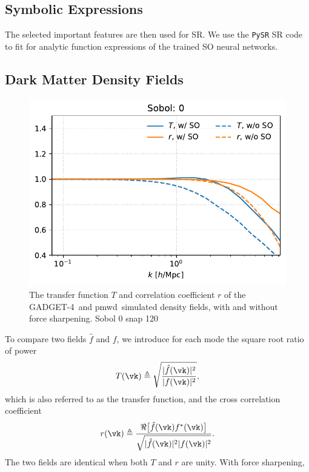\documentclass[modern, trackchanges, dvipsnames]{aastex631}
\newcommand{\pmwd}{{\usefont{T1}{nova}{m}{sl}pmwd}}
\newcommand{\GADGET}{{{\fontsize{10pt}{12pt}\selectfont GADGET}-4}}
\begin{document}
\subsection{Symbolic Expressions}

The selected important features are then used for SR.
We use the \texttt{PySR} \citep{PySR} SR code to fit for analytic
function expressions of the trained SO neural networks.


\subsection{Dark Matter Density Fields}

\begin{figure}
  \centering
  \includegraphics[width=.8\columnwidth]{sobol0snap120epoch300.pdf}
  \caption{The transfer function $T$ and correlation coefficient $r$ of the
  \GADGET\ and \pmwd\ simulated density fields, with and without force
  sharpening.
  Sobol 0 snap 120}
  \label{fig:tfcc}
\end{figure}

To compare two fields $\hat f$ and $f$, we introduce for each mode the square
root ratio of power
%
\begin{equation}
T(\vk) \triangleq
\sqrt{\frac{|\hat f(\vk)|^2}{|f(\vk)|^2}},
\label{T}
\end{equation}
%
which is also referred to as the transfer function, and the cross correlation
coefficient
%
\begin{equation}
r(\vk) \triangleq
\frac{\Re \bigl[ \hat f(\vk) f^*(\vk) \bigr]}
     {\sqrt{|\hat f(\vk)|^2 |f(\vk)|^2}}.
\label{r}
\end{equation}
%
The two fields are identical when both $T$ and $r$ are unity.
With force sharpening,
\end{document}

